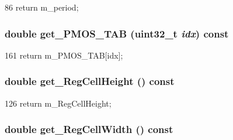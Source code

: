 \begin{DoxyCode}
86 { return m_period; }
\end{DoxyCode}
\hypertarget{classTechParameter_ac30923485e8060838bf0e23c152aa3d6}{
\subsubsection[{get\_\-PMOS\_\-TAB}]{\setlength{\rightskip}{0pt plus 5cm}double get\_\-PMOS\_\-TAB ({\bf uint32\_\-t} {\em idx}) const}}
\label{classTechParameter_ac30923485e8060838bf0e23c152aa3d6}



\begin{DoxyCode}
161 { return m_PMOS_TAB[idx]; }
\end{DoxyCode}
\hypertarget{classTechParameter_ab5d5d4c0a811f4eef47ac4faac45e850}{
\subsubsection[{get\_\-RegCellHeight}]{\setlength{\rightskip}{0pt plus 5cm}double get\_\-RegCellHeight () const}}
\label{classTechParameter_ab5d5d4c0a811f4eef47ac4faac45e850}



\begin{DoxyCode}
126 { return m_RegCellHeight; }
\end{DoxyCode}
\hypertarget{classTechParameter_a48c7337f3503870cebe9c2791fc65045}{
\subsubsection[{get\_\-RegCellWidth}]{\setlength{\rightskip}{0pt plus 5cm}double get\_\-RegCellWidth () const}}
\label{classTechParameter_a48c7337f3503870cebe9c2791fc65045}




